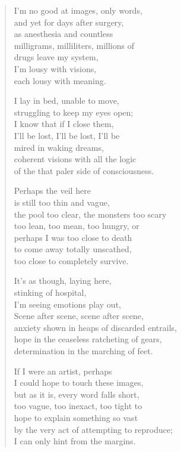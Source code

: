 \begin{verse}
I'm no good at images, only words,\\
and yet for days after surgery,\\
as anesthesia and countless\\
\vin milligrams, milliliters, millions of\\
drugs leave my system,\\
I'm lousy with visions,\\
each lousy with meaning.

I lay in bed, unable to move,\\
struggling to keep my eyes open;\\
I know that if I close them,\\
\vin I'll be lost, I'll be lost, I'll be\\
mired in waking dreams,\\
coherent visions with all the logic\\
of the that paler side of consciousness.

Perhaps the veil here\\
is still too thin and vague,\\
the pool too clear, the monsters too scary\\
\vin too lean, too mean, too hungry, or\\
perhaps I was too close to death\\
to come away totally unscathed,\\
too close to completely survive.
\newpage

\vin It's as though, laying here,\\
\vin stinking of hospital,\\
\vin I'm seeing emotions play out,\\
\vin \vin Scene after scene, scene after scene,\\
\vin anxiety shown in heaps of discarded entrails,\\
\vin hope in the ceaseless ratcheting of gears,\\
\vin determination in the marching of feet.

If I were an artist, perhaps\\
I could hope to touch these images,\\
but as it is, every word falls short,\\
\vin too vague, too inexact, too tight to\\
hope to explain something so vast\\
by the very act of attempting to reproduce;\\
I can only hint from the margins.


\end{verse}
